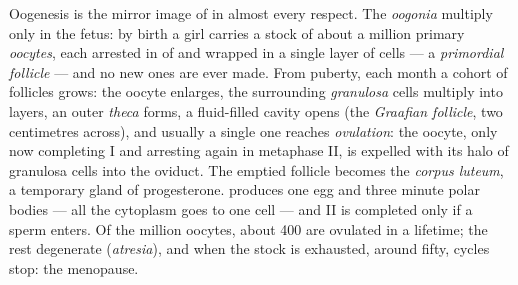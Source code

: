 \begin{definition}\label{def:b2:mammal-reproduction:ovary}
Oogenesis is the mirror image of  in almost every
respect. The \emph{oogonia} multiply only in the fetus: by birth a
girl carries a stock of about a million primary \emph{oocytes},
each arrested in  of  and wrapped in a single layer
of cells --- a \emph{primordial follicle} --- and no new ones are ever
made. From puberty, each month a cohort of follicles grows: the
oocyte enlarges, the surrounding \emph{granulosa} cells multiply
into layers, an outer \emph{theca} forms, a fluid-filled cavity
opens (the \emph{Graafian follicle}, two centimetres across), and
usually a single one reaches \emph{ovulation}: the oocyte, only now
completing  I and arresting again in metaphase II, is expelled
with its halo of granulosa cells into the oviduct. The emptied
follicle becomes the \emph{corpus luteum}, a temporary gland of
progesterone.  produces one egg and three minute polar bodies
--- all the cytoplasm goes to one cell --- and  II is
completed only if a sperm enters. Of the million oocytes, about
\num{400} are ovulated in a lifetime; the rest degenerate
(\emph{atresia}), and when the stock is exhausted, around fifty,
cycles stop: the menopause.
\end{definition}

